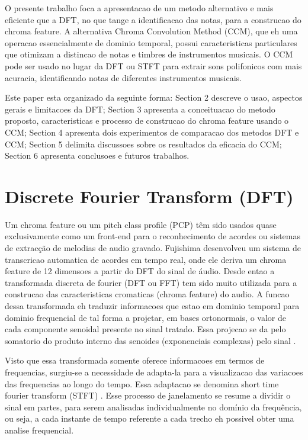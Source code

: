 \documentclass{article}
\begin{document}
	O presente trabalho foca a apresentacao de um metodo alternativo e mais eficiente que a DFT, no que tange a identificacao das notas, para a construcao do chroma feature. A alternativa Chroma Convolution Method (CCM), que eh uma operacao essencialmente de dominio temporal, possui caracteristicas particulares que otimizam a distincao de notas e timbres de instrumentos musicais. O CCM pode ser usado no lugar da DFT ou STFT para extrair sons polifonicos com mais acuracia, identificando notas de diferentes instrumentos musicais.

	Este paper esta organizado da seguinte forma: Section 2 descreve o usao, aspectos gerais e limitacoes da DFT; Section 3 apresenta a conceituacao do metodo proposto, caracteristicas e processo de construcao do chroma feature usando o CCM; Section 4 apresenta dois experimentos de comparacao dos metodos DFT e CCM; Section 5 delimita discussoes sobre os resultados da eficacia do CCM; Section 6 apresenta conclusoes e futuros trabalhos.

\section{Discrete Fourier Transform (DFT)}\label{sec:sfft}

		Um chroma feature ou um pitch class profile (PCP) têm sido usados quase exclusivamente como um front-end para o
	reconhecimento de acordes ou sistemas de extracção de melodias de audio gravado. Fujishima \cite{fujishima1999realtime} desenvolveu um sistema de transcricao automatica de acordes em tempo real, onde ele deriva um chroma feature de 12 dimensoes a partir do DFT do sinal de áudio. Desde entao a transformada discreta de fourier (DFT ou  FFT) tem sido muito utilizada para a construcao das caracteristicas cromaticas (chroma feature) do audio. A funcao dessa transformada eh traduzir informacoes que estao em dominio temporal para dominio frequencial de tal forma a projetar, em bases ortonormais, o valor de cada componente senoidal presente no sinal tratado. Essa projecao se da pelo somatorio do produto interno das senoides (exponenciais complexas) pelo sinal \cite{vaidyanathan1993multirate}.

	Visto que essa transformada somente oferece informacoes em termos de frequencias, surgiu-se a necessidade de adapta-la para a visualizacao das variacoes das frequencias ao longo do tempo. Essa adaptacao se denomina short time fourier transform (STFT) \cite{cohen1995time}. Esse processo de janelamento se resume a dividir o sinal em partes, para serem analisadas individualmente no domínio da frequência, ou seja, a cada instante de tempo referente a cada trecho eh possivel obter uma analise frequencial.
\end{document}
